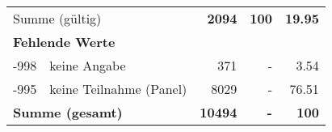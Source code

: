 \begin{longtable}{lXrrr}
     \midrule
     \multicolumn{2}{l}{Summe (gültig)} &
       \textbf{\num{2094}} &
     \textbf{100} &
       \textbf{\num[round-mode=places,round-precision=2]{19,95}} \\
     \multicolumn{5}{l}{\textbf{Fehlende Werte}}\\
       -998 &
       keine Angabe &
         \num{371} &
        - &
         \num[round-mode=places,round-precision=2]{3,54} \\
       -995 &
       keine Teilnahme (Panel) &
         \num{8029} &
        - &
         \num[round-mode=places,round-precision=2]{76,51} \\
     \midrule
     \multicolumn{2}{l}{\textbf{Summe (gesamt)}} &
          \textbf{\num{10494}} &
        \textbf{-} &
        \textbf{100} \\
     \bottomrule
     \end{longtable}
     
